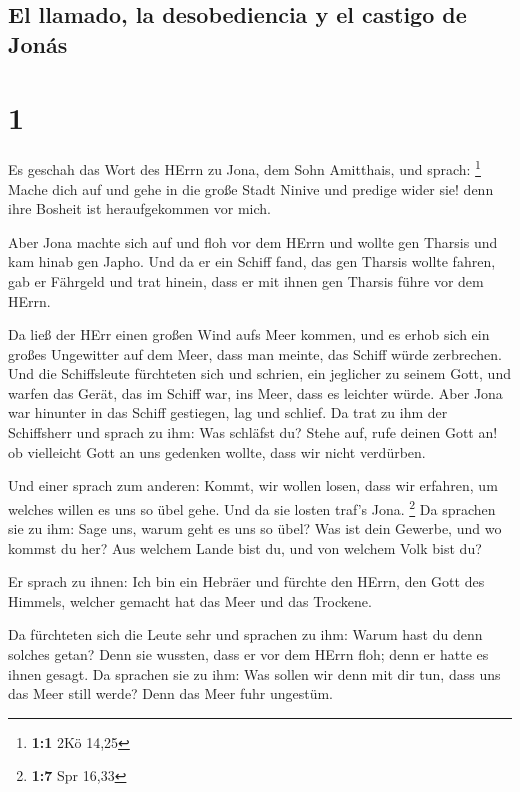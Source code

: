 \hypertarget{el-llamado-la-desobediencia-y-el-castigo-de-jonuxe1s}{%
\subsection{El llamado, la desobediencia y el castigo de
Jonás}\label{el-llamado-la-desobediencia-y-el-castigo-de-jonuxe1s}}

\hypertarget{section}{%
\section{1}\label{section}}

 Es geschah das Wort des HErrn zu Jona, dem Sohn
Amitthais, und sprach: \footnote{\textbf{1:1} 2Kö 14,25} 
Mache dich auf und gehe in die große Stadt Ninive und predige wider sie!
denn ihre Bosheit ist heraufgekommen vor mich.

 Aber Jona machte sich auf und floh vor dem HErrn und
wollte gen Tharsis und kam hinab gen Japho. Und da er ein Schiff fand,
das gen Tharsis wollte fahren, gab er Fährgeld und trat hinein, dass er
mit ihnen gen Tharsis führe vor dem HErrn.

 Da ließ der HErr einen großen Wind aufs Meer kommen, und
es erhob sich ein großes Ungewitter auf dem Meer, dass man meinte, das
Schiff würde zerbrechen.  Und die Schiffsleute fürchteten
sich und schrien, ein jeglicher zu seinem Gott, und warfen das Gerät,
das im Schiff war, ins Meer, dass es leichter würde. Aber Jona war
hinunter in das Schiff gestiegen, lag und schlief.  Da
trat zu ihm der Schiffsherr und sprach zu ihm: Was schläfst du? Stehe
auf, rufe deinen Gott an! ob vielleicht Gott an uns gedenken wollte,
dass wir nicht verdürben.

 Und einer sprach zum anderen: Kommt, wir wollen losen,
dass wir erfahren, um welches willen es uns so übel gehe. Und da sie
losten traf's Jona. \footnote{\textbf{1:7} Spr 16,33}  Da
sprachen sie zu ihm: Sage uns, warum geht es uns so übel? Was ist dein
Gewerbe, und wo kommst du her? Aus welchem Lande bist du, und von
welchem Volk bist du?

 Er sprach zu ihnen: Ich bin ein Hebräer und fürchte den
HErrn, den Gott des Himmels, welcher gemacht hat das Meer und das
Trockene.

 Da fürchteten sich die Leute sehr und sprachen zu ihm:
Warum hast du denn solches getan? Denn sie wussten, dass er vor dem
HErrn floh; denn er hatte es ihnen gesagt.  Da sprachen
sie zu ihm: Was sollen wir denn mit dir tun, dass uns das Meer still
werde? Denn das Meer fuhr ungestüm.

